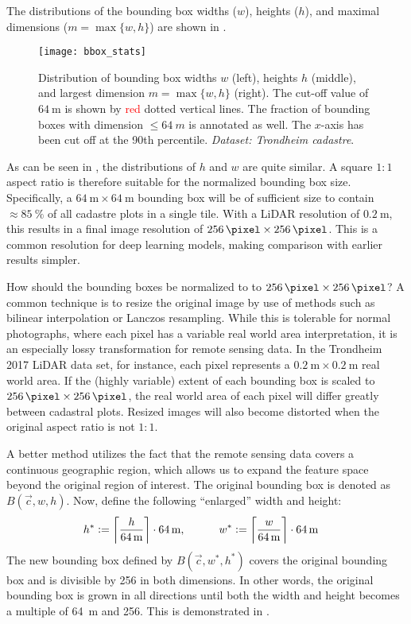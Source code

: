 The distributions of the bounding box widths ($w$), heights ($h$), and maximal dimensions ($m = \max \{w, h\}$) are shown in .

\begin{figure}[htb]
  \texttt{[image: bbox\_stats]}
  \caption{
    Distribution of bounding box widths $w$ (left), heights $h$ (middle), and largest dimension $m = \max \{w, h\}$ (right).
    The cut-off value of $\SI{64}{\meter}$ is shown by \textcolor{red}{red} dotted vertical lines.
    The fraction of bounding boxes with dimension $\leq \SI{64}{m}$ is annotated as well.
    The $x$-axis has been cut off at the 90th percentile.
    \textit{Dataset: Trondheim cadastre}.
  }
  \label{fig:bbox-stats}
\end{figure}

As can be seen in , the distributions of $h$ and $w$ are quite similar.
A square $1:1$ aspect ratio is therefore suitable for the normalized bounding box size.
Specifically, a $\SI{64}{\meter} \times \SI{64}{\meter}$ bounding box will be of sufficient size to contain $\approx \SI{85}{\percent}$ of all cadastre plots in a single tile.
With a LiDAR resolution of $\SI{0.2}{\meter}$, this results in a final image resolution of $\SI{256}{\pixel} \times \SI{256}{\pixel}$.
This is a common resolution for deep learning models, making comparison with earlier results simpler.

How should the bounding boxes be normalized to to $\SI{256}{\pixel} \times \SI{256}{\pixel}$?
A common technique is to resize the original image by use of methods such as bilinear interpolation or Lanczos resampling.
While this is tolerable for normal photographs, where each pixel has a variable real world area interpretation, it is an especially lossy transformation for remote sensing data.
In the Trondheim 2017 LiDAR data set, for instance, each pixel represents a $\SI{0.2}{\meter} \times \SI{0.2}{\meter}$ real world area.
If the (highly variable) extent of each bounding box is scaled to $\SI{256}{\pixel} \times \SI{256}{\pixel}$, the real world area of each pixel will differ greatly between cadastral plots.
Resized images will also become distorted when the original aspect ratio is not $1:1$.

A better method utilizes the fact that the remote sensing data covers a continuous geographic region, which allows us to expand the feature space beyond the original region of interest.
The original bounding box is denoted as $B(\vec{c}, w, h)$.
Now, define the following \enquote{enlarged} width and height:
%
\begin{align*}
  h^* &:= \left\lceil \frac{h}{\SI{64}{\meter}} \right\rceil \cdot \SI{64}{\meter},
  \hspace{3em}
  w^* := \left\lceil \frac{w}{\SI{64}{\meter}} \right\rceil \cdot \SI{64}{\meter}
\end{align*}
%
The new bounding box defined by $B(\vec{c}, w^*, h^*)$ covers the original bounding box and is divisible by \SI{256}{\pixel} in both dimensions.
In other words, the original bounding box is grown in all directions until both the width and height becomes a multiple of \SI{64}{\meter} and \SI{256}{\pixel}.
This is demonstrated in .

